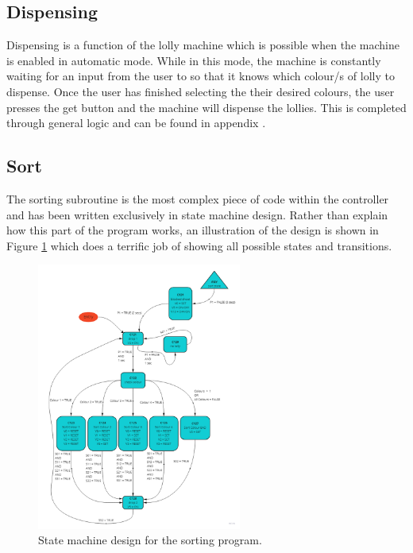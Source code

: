     \subsection{Dispensing}
        Dispensing is a function of the lolly machine which is possible when the machine is enabled in automatic mode. While in this mode, the machine is constantly waiting for an input from the user to so that it knows which colour/s of lolly to dispense. Once the user has finished selecting the their desired colours, the user presses the get button and the machine will dispense the lollies. This is completed through general logic and can be found in appendix .
        
    \subsection{Sort}
        The sorting subroutine is the most complex piece of code within the controller and has been written exclusively in state machine design. Rather than explain how this part of the program works, an illustration of the design is shown in Figure \ref{fig:sortStateMachine} which does a terrific job of showing all possible states and transitions. 

        \begin{figure}[H]
            \centering
            \includegraphics[width = 0.6\textwidth]{2_images/sortStateMachine}
            \caption{State machine design for the sorting program.}
            \label{fig:sortStateMachine}
        \end{figure}
        
